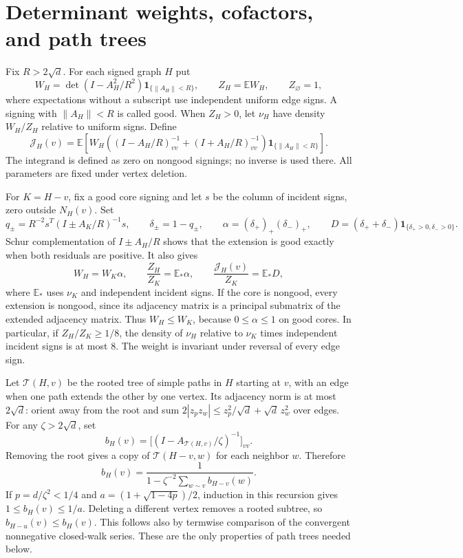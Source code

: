 \documentclass[11pt]{article}
\numberwithin{equation}{section}
\newcommand{\E}{\mathbb E}
\newcommand{\norm}[1]{\left\lVert#1\right\rVert}
\begin{document}
\section{Determinant weights, cofactors, and path trees}
Fix $R>2\sqrt d$. For each signed graph $H$ put
\[
 W_H=\det(I-A_H^2/R^2)\mathbf1_{\{\norm{A_H}<R\}},
 \qquad Z_H=\E W_H,\qquad Z_\varnothing=1,
\]
where expectations without a subscript use independent uniform edge
signs. A signing with $\norm{A_H}<R$ is called good. When $Z_H>0$,
let $\nu_H$ have density $W_H/Z_H$ relative to uniform signs. Define
\[
 \mathcal J_H(v)=\E\left[W_H\left((I-A_H/R)^{-1}_{vv}
                       +(I+A_H/R)^{-1}_{vv}\right)
                         \mathbf1_{\{\norm{A_H}<R\}}\right].
\]
The integrand is defined as zero on nongood signings; no inverse is
used there. All parameters are fixed under vertex deletion.

For $K=H-v$, fix a good core signing and let $s$ be the column of
incident signs, zero outside $N_H(v)$. Set
\[
 q_\pm=R^{-2}s^T(I\pm A_K/R)^{-1}s,\qquad
 \delta_\pm=1-q_\pm,\qquad
 \alpha=(\delta_+)_+(\delta_-)_+,
 \qquad D=(\delta_++\delta_-)\mathbf1_{\{\delta_+>0,\delta_->0\}}.
\]
Schur complementation of $I\pm A_H/R$ shows that the extension is
good exactly when both residuals are positive. It also gives
\begin{equation}\label{eq:insertion-identities}
 W_H=W_K\alpha,\qquad
 \frac{Z_H}{Z_K}=\E_*\alpha,\qquad
 \frac{\mathcal J_H(v)}{Z_K}=\E_*D,
\end{equation}
where $\E_*$ uses $\nu_K$ and independent incident signs. If the core
is nongood, every extension is nongood, since its adjacency matrix
is a principal submatrix of the extended adjacency matrix. Thus
$W_H\le W_K$, because $0\le\alpha\le1$ on good cores. In particular,
if $Z_H/Z_K\ge1/8$, the density of $\nu_H$ relative to
$\nu_K$ times independent incident signs is at most $8$.
The weight is invariant under reversal of every edge sign.

Let $\mathcal T(H,v)$ be the rooted tree of simple paths in $H$
starting at $v$, with an edge when one path extends the other by
one vertex. Its adjacency norm is at most $2\sqrt d$: orient away
from the root and sum
$2|z_pz_w|\le z_p^2/\sqrt d+\sqrt d\,z_w^2$ over edges.
For any $\zeta>2\sqrt d$, set
\[
 b_H(v)=\bigl[(I-A_{\mathcal T(H,v)}/\zeta)^{-1}\bigr]_{vv}.
\]
Removing the root gives a copy of $\mathcal T(H-v,w)$ for each
neighbor $w$. Therefore
\begin{equation}\label{eq:path-recursion}
 b_H(v)=\frac1{1-\zeta^{-2}\sum_{w\sim v}b_{H-v}(w)}.
\end{equation}
If $p=d/\zeta^2<1/4$ and $a=(1+\sqrt{1-4p})/2$, induction in
this recursion gives $1\le b_H(v)\le1/a$. Deleting a different
vertex removes a rooted subtree, so
$b_{H-u}(v)\le b_H(v)$. This follows also by termwise comparison
of the convergent nonnegative closed-walk series. These are the
only properties of path trees needed below.
\end{document}

